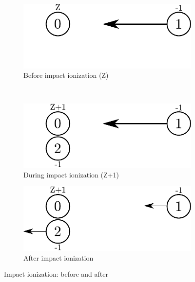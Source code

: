 \begin{figure}
 \centering
    \begin{subfigure}{0.48\columnwidth}
        \centering
        \includegraphics[width=\textwidth]{figures/impact_ionization_t00}
        \caption{Before impact ionization (Z)}
        \label{fig:impact:before:Z}
    \end{subfigure}
\\
    \begin{subfigure}{0.48\columnwidth}
        \centering
        \includegraphics[width=\textwidth]{figures/impact_ionization_t0}
        \caption{During impact ionization (Z+1)}
        \label{fig:impact:before:Zp1}
    \end{subfigure}
%
    \begin{subfigure}{0.48\columnwidth}
        \centering
        \includegraphics[width=\textwidth]{figures/impact_ionization_t1}
        \caption{After impact ionization}
        \label{fig:impact:after}
    \end{subfigure}
\caption{Impact ionization: before and after}
\label{fig:impact:steps}
\end{figure}


